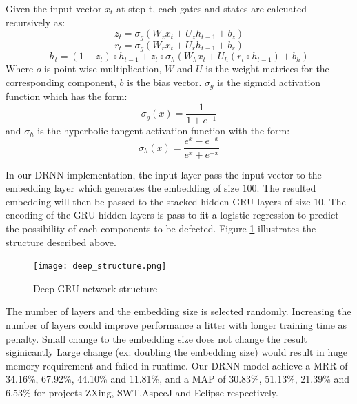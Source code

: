 Given the input vector $x_t$ at step t, each gates and states are calcuated recursively as:
\begin{equation}
	z_t = \sigma_g(W_zx_t+U_{z}h_{t-1}+b_z)
\end{equation}	
\begin{equation}
	r_t =  \sigma_g(W_rx_t+U_{r}h_{t-1}+b_r)
\end{equation}	
\begin{equation}
	h_t=(1-z_t) \circ h_{t-1} + z_t \circ \sigma_h(W_hx_t+U_{h}(r_t \circ h_{t-1})+b_h)
\end{equation}
Where $o$ is point-wise multiplication, $W$ and $U$ is the weight matrices for the corresponding component, $b$ is the bias vector.
$\sigma_g$ is the sigmoid activation function which has the form:
\begin{equation}
	\sigma_g(x) = \frac{1}{1+e^{-1}}
\end{equation}
and $\sigma_h$ is the hyperbolic tangent activation function with the form:
\begin{equation}
\sigma_h(x)=\frac{e^x - e^{-x}}{e^x + e^{-x}}	
\end{equation}

In our DRNN implementation, the input layer pass the input vector to the embedding layer which generates the embedding of size $100$.
The resulted embedding will then be passed to the stacked hidden GRU layers of size $10$.
The encoding of the GRU hidden layers is pass to fit a logistic regression to predict the possibility of each components to be defected.
Figure \ref{dnn} illustrates the structure described above.

\begin{figure}
	\texttt{[image: deep\_structure.png]}
	\caption{Deep GRU network structure}
	\label{dnn}
\end{figure}

The number of layers and the embedding size is selected randomly. 
Increasing the number of layers could improve performance a litter with longer training time as penalty.
Small change to the embedding size does not change the result siginicantly
Large change (ex: doubling the embedding size) would result in huge memory requirement and failed in runtime.
Our DRNN model achieve a MRR of 34.16\%, 67.92\%, 44.10\% and 11.81\%, and a MAP of 30.83\%, 51.13\%, 21.39\% and 6.53\%  for projects ZXing, SWT,AspecJ and Eclipse respectively. 


